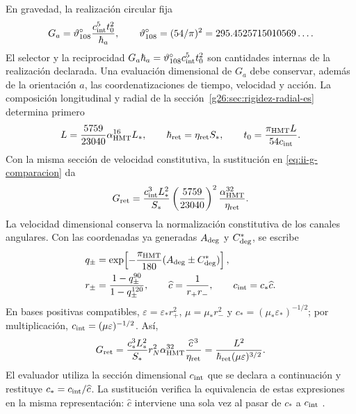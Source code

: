 En gravedad, la realización circular fija
\begin{equation}
 G_a=\vartheta_{108}^{\circ}\frac{c_{\rm int}^{5}t_0^2}{\hbar_a},
 \qquad
 \vartheta_{108}^{\circ}=(54/\pi)^2
 =295.4525715010569\ldots.
 \label{eq:ii-g-comparacion}
\end{equation}
El selector y la reciprocidad \(G_a\hbar_a=
\vartheta_{108}^{\circ}c_{\rm int}^{5}t_0^2\) son cantidades internas de
la realización declarada. Una evaluación dimensional de \(G_a\) debe
conservar, además de la orientación \(a\), las coordenatizaciones de tiempo,
velocidad y acción. La composición longitudinal y radial de la
sección~\ref{g26:sec:rigidez-radial-es} determina primero
\[
 L=\frac{5759}{23040}\alpha_{\mathrm{HMT}}^{16}L_*,\qquad
 \hbar_{\rm ret}=\eta_{\rm ret}S_*,\qquad
 t_0=\frac{\pi_{\mathrm{HMT}}L}{54c_{\rm int}}.
\]
Con la misma sección de velocidad constitutiva, la sustitución en
\eqref{eq:ii-g-comparacion} da
\[
 G_{\rm ret}=\frac{c_{\rm int}^3L_*^2}{S_*}
 \left(\frac{5759}{23040}\right)^2
 \frac{\alpha_{\mathrm{HMT}}^{32}}{\eta_{\rm ret}}.
\]
La velocidad dimensional conserva la normalización constitutiva de los
canales angulares. Con las coordenadas ya generadas \(A_{\rm deg}\)
y \(C^*_{\rm deg}\), se escribe
\begin{equation}
 \begin{aligned}
 q_\pm&=\exp\!\left[-\frac{\pi_{\mathrm{HMT}}}{180}
               (A_{\rm deg}\pm C^*_{\rm deg})\right],\\
 r_\pm&=\frac{1-q_\pm^{90}}{1-q_\pm^{120}},\qquad
 \widehat c=\frac1{r_+r_-},\qquad c_{\rm int}=c_*\widehat c.
 \end{aligned}
 \label{eq:ii-g26-velocidad-constitutiva}
\end{equation}
En bases positivas compatibles,
\(\varepsilon=\varepsilon_*r_+^2\), \(\mu=\mu_*r_-^2\) y
\(c_*=(\mu_*\varepsilon_*)^{-1/2}\); por multiplicación,
\(c_{\rm int}=(\mu\varepsilon)^{-1/2}\). Así,
\begin{equation}
 G_{\rm ret}=\frac{c_*^3L_*^2}{S_*}
 r_N^2\alpha_{\mathrm{HMT}}^{32}\frac{\widehat c^{\,3}}{\eta_{\rm ret}}
 =\frac{L^2}{\hbar_{\rm ret}(\mu\varepsilon)^{3/2}}.
 \label{eq:ii-g26-gravedad-constitutiva}
\end{equation}
El evaluador utiliza la sección dimensional \(c_{\rm int}\) que
se declara a continuación y restituye \(c_*=c_{\rm int}/\widehat c\).
La sustitución verifica la equivalencia de estas expresiones en la misma
representación: \(\widehat c\) interviene una sola vez al pasar de
\(c_*\) a \(c_{\rm int}\) \cite{hmtg26counter}.

